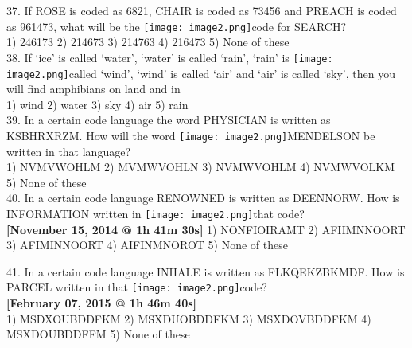 \documentclass[
]{article}
\begin{document}
37. If ROSE is coded as 6821, CHAIR is coded as 73456 and PREACH is coded as 961473, what
will be the \texttt{[image: image2.png]}code for SEARCH?\\
1) 246173 \hspace{2mm}2) 214673 \hspace{2mm}3) 214763 \hspace{2mm}4) 216473 \hspace{2mm}5) None of these\\

38. If ‘ice’ is called ‘water’, ‘water’ is called ‘rain’, ‘rain’ is \texttt{[image: image2.png]}called ‘wind’, ‘wind’ is called ‘air’ and
‘air’ is called ‘sky’, then you will find amphibians on land and in\\
1) wind \hspace{2mm}2) water \hspace{2mm}3) sky \hspace{2mm}4) air \hspace{2mm}5) rain\\

39. In a certain code language the word PHYSICIAN is written as KSBHRXRZM. How will the
word \texttt{[image: image2.png]}MENDELSON be written in that language?\\
1) NVMVWOHLM \hspace{2mm}2) MVMWVOHLN \hspace{2mm}3) NVMWVOHLM \hspace{2mm}4) NVMWVOLKM \hspace{2mm}5) None of these\\

40. In a certain code language RENOWNED is written as DEENNORW. How is
INFORMATION written in \texttt{[image: image2.png]}that code?\\
\textbf{[November 15, 2014 @ 1h 41m 30s]}
1) NONFIOIRAMT \hspace{2mm}2) AFIIMNNOORT \hspace{2mm}3) AFIMINNOORT \hspace{2mm}4) AIFINMNOROT \hspace{2mm}5) None of these

41. In a certain code language INHALE is written as FLKQEKZBKMDF. How is PARCEL
written in that \texttt{[image: image2.png]}code? \\
\textbf{[February 07, 2015 @ 1h 46m 40s]}\\
1) MSDXOUBDDFKM \hspace{2mm}2) MSXDUOBDDFKM\hspace{2mm} 3) MSXDOVBDDFKM \hspace{2mm}4) MSXDOUBDDFFM
\hspace{2mm}5) None of these
\end{document}
